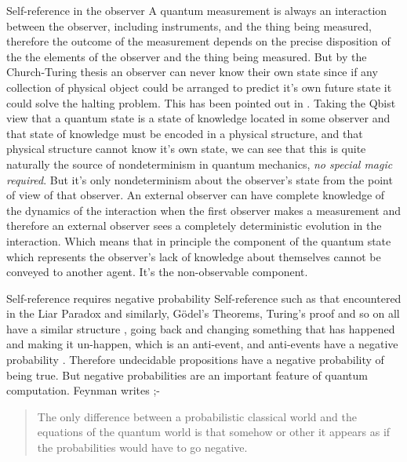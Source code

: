 \documentclass[final]{beamer}
\newlength{\colwidth}
\begin{document}
\begin{frame}[t]
\begin{columns}[t]
\begin{column}{\colwidth}
  \begin{block}{Self-reference in the observer}
  A quantum measurement is always an interaction between the observer, including instruments, and the thing being measured, therefore the outcome of the measurement depends on the precise disposition of the the elements of the observer and the thing being measured. But by the Church-Turing thesis an observer can never know their own state since if any collection of physical object could be arranged to predict it's own future state it could solve the halting problem. This has been pointed out in \autocite{Popper1950IndeterminismI, Popper1950IndeterminismII}. Taking the Qbist view that a quantum state is a state of knowledge located in some observer and that state of knowledge must be encoded in a physical structure, and that physical structure cannot know it's own state, we can see that this is quite naturally the source of nondeterminism in quantum mechanics, \emph{no special magic required}. But it's only nondeterminism about the observer's state from the point of view of that observer. An external observer can have complete knowledge of the dynamics of the interaction when the first observer makes a measurement and therefore an external observer sees a completely deterministic evolution in the interaction. Which means that in principle the component of the quantum state which represents the observer's lack of knowledge about themselves cannot be conveyed to another agent. It's the non-observable component. 
  \end{block}

  \begin{block}{Self-reference requires negative probability}
  Self-reference such as that encountered in the Liar Paradox and similarly, G\"odel's Theorems, Turing's proof and so on all have a similar structure \autocite{Yanofsky2003}, going back and changing something that has happened and making it un-happen, which is an anti-event, and anti-events have a negative probability \autocite{Burgin2013}. Therefore undecidable propositions have a negative probability of being true. But negative probabilities are an important feature of quantum computation. Feynman writes \autocite{Feynman_r_82} ;-
  
  \begin{quote}
    The only difference between a probabilistic classical world and the equations of the quantum world is that somehow or other it appears as if the probabilities would have to go negative.
  \end{quote}
  

\end{block}
\end{column}
\end{columns}
\end{frame}
\end{document}
